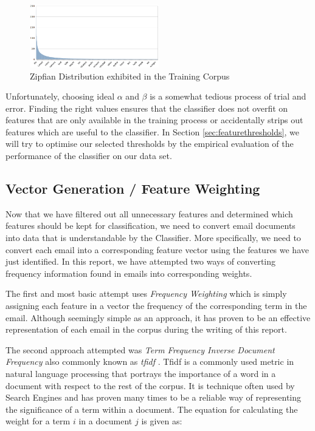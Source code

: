 \begin{figure}[h!]
    \centering
    \includegraphics[width=0.5\textwidth]{zipfian.png}
    \caption{Zipfian Distribution exhibited in the Training Corpus}
    \label{zipfian}
\end{figure}

Unfortunately, choosing ideal \(\alpha \) and \(\beta\) is a somewhat tedious process of trial and error.
Finding the right values ensures that the classifier does not overfit on features that are only available in the training process or accidentally strips out features which are useful to the classifier.
In Section \ref{sec:featurethresholds}, we will try to optimise our selected thresholds by the empirical evaluation of the performance of the classifier on our data set.

\subsection{Vector Generation / Feature Weighting}

Now that we have filtered out all unnecessary features and determined which features should be kept for classification, we need to convert email documents into data that is understandable by the Classifier. More specifically, we need to convert each email into a corresponding feature vector using the features we have just identified. In this report, we have attempted two ways of converting frequency information found in emails into corresponding weights. 

The first and most basic attempt uses \emph{Frequency Weighting} which is simply assigning each feature in a vector the frequency of the corresponding term in the email. Although seemingly simple as an approach, it has proven to be an effective representation of each email in the corpus during the writing of this report.

The second approach attempted was \emph{Term Frequency Inverse Document Frequency} also commonly known as \emph{tfidf} \cite{tfidf1973}. Tfidf is a commonly used metric in natural language processing that portrays the importance of a word in a document with respect to the rest of the corpus. It is technique often used by Search Engines and has proven many times to be a reliable way of representing the significance of a term within a document. The equation for calculating the weight for a term $i$ in a document $j$ is given as:


